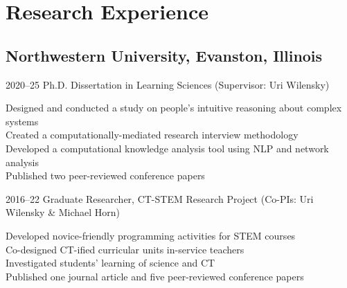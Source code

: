 \documentclass[11pt,letterpaper]{report} %
\newcommand{\indentedsmall}[1]{\hspace{2pt}\small{#1}\normalsize}
\begin{document}


    \section*{Research Experience}

    \subsection*{Northwestern University, Evanston, Illinois}

    \begin{tablist}

        \item[2020--25] \tab{}Ph.D. Dissertation in Learning Sciences (Supervisor: Uri Wilensky) \\

        \vspace{4pt}

        \indentedsmall{Designed and conducted a study on people's intuitive reasoning about complex systems}  \\
        \indentedsmall{Created a computationally-mediated research interview methodology}  \\
        \indentedsmall{Developed a computational knowledge analysis tool using NLP and network analysis} \\
        \indentedsmall{Published two peer-reviewed conference papers} \\

        \vspace{6pt}

        \item[2016--22] \tab{}Graduate Researcher, CT-STEM Research Project (Co-PIs: Uri Wilensky \& Michael Horn) \\

        \vspace{4pt}

        \indentedsmall{Developed novice-friendly programming activities for STEM courses} \\
        \indentedsmall{Co-designed CT-ified curricular units in-service teachers} \\
        \indentedsmall{Investigated students' learning of science and CT} \\
        \indentedsmall{Published one journal article and five peer-reviewed conference papers}

    \end{tablist}
\end{document}

